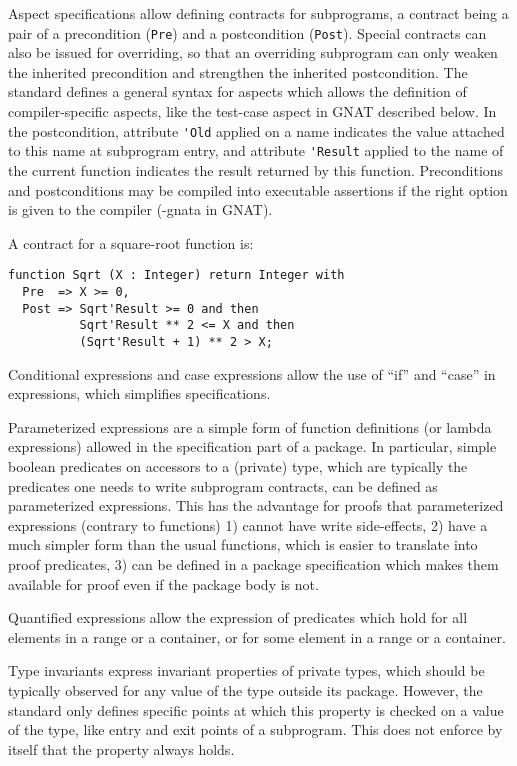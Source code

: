 \documentclass[fullpage]{article}
\newcounter{example}
\newenvironment{example}[1][EXAMPLE \theexample]{%
\par
\refstepcounter{example}%
\SpecialEnv{#1}{exampleborder}{examplebg}{}{\theexample}%
}{%
\endSpecialEnv
}
\begin{document}
Aspect specifications allow defining contracts for subprograms, a contract
being a pair of a precondition (\verb|Pre|) and a postcondition
(\verb|Post|). Special contracts can also be issued for overriding, so that an
overriding subprogram can only weaken the inherited precondition and strengthen
the inherited postcondition. The standard defines a general syntax for aspects
which allows the definition of compiler-specific aspects, like the test-case
aspect in GNAT described below. In the postcondition, attribute \verb|'Old|
applied on a name indicates the value attached to this name at subprogram
entry, and attribute \verb|'Result| applied to the name of the current function
indicates the result returned by this function. Preconditions and
postconditions may be compiled into executable assertions if the right option
is given to the compiler (-gnata in GNAT).

\begin{example}
A contract for a square-root function is:
\begin{verbatim}
function Sqrt (X : Integer) return Integer with
  Pre  => X >= 0,
  Post => Sqrt'Result >= 0 and then
          Sqrt'Result ** 2 <= X and then
          (Sqrt'Result + 1) ** 2 > X;
\end{verbatim}
\end{example}

Conditional expressions and case expressions allow the use of ``if'' and
``case'' in expressions, which simplifies specifications.

Parameterized expressions are a simple form of function definitions (or lambda
expressions) allowed in the specification part of a package. In particular,
simple boolean predicates on accessors to a (private) type, which are typically
the predicates one needs to write subprogram contracts, can be defined as
parameterized expressions. This has the advantage for proofs that parameterized
expressions (contrary to functions) 1) cannot have write side-effects, 2) have
a much simpler form than the usual functions, which is easier to translate into
proof predicates, 3) can be defined in a package specification which makes them
available for proof even if the package body is not.

Quantified expressions allow the expression of predicates which hold for all
elements in a range or a container, or for some element in a range or a
container.

Type invariants express invariant properties of private types, which should be
typically observed for any value of the type outside its package. However, the
standard only defines specific points at which this property is checked on a
value of the type, like entry and exit points of a subprogram. This does not
enforce by itself that the property always holds.
\end{document}
